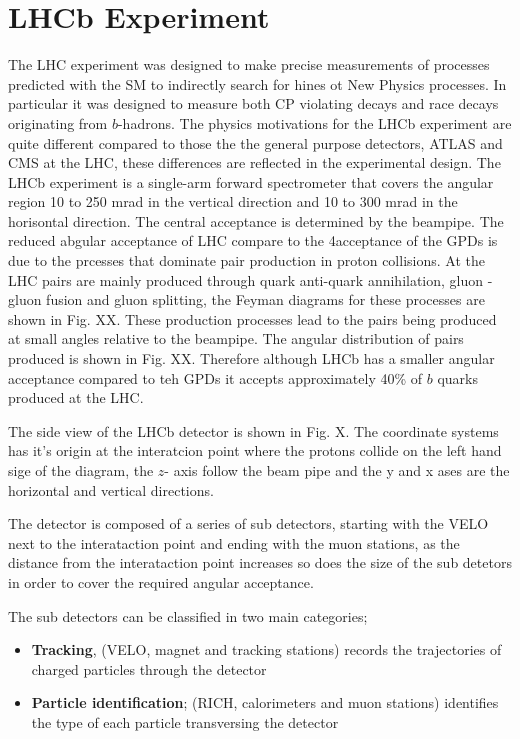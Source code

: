\section{LHCb Experiment}

The LHC experiment was designed to make precise measurements of processes predicted with the SM to indirectly search for hines ot New Physics processes. %
In particular it was designed to measure both CP violating decays and race decays originating from $b$-hadrons. The physics motivations for the LHCb experiment are quite different compared to those the the general purpose detectors, ATLAS and CMS at the LHC, these differences are reflected in the experimental design. The LHCb experiment is a single-arm forward spectrometer that covers the angular region 10 to 250 mrad in the vertical direction and 10 to 300 mrad in the horisontal direction. The central acceptance is determined by the beampipe. The reduced abgular acceptance of LHC compare to the 4\pi acceptance of the GPDs is due to the prcesses that dominate \bbbar pair production in proton collisions. At the LHC \bbbar pairs are mainly produced through quark anti-quark annihilation, gluon - gluon fusion and gluon splitting, the Feyman diagrams for these processes are shown in Fig. XX. %
These production processes lead to the \bbbar pairs being produced at small angles relative to the beampipe. The angular distribution of \bbbar pairs produced is shown in Fig. XX. Therefore although LHCb has a smaller angular acceptance compared to teh GPDs it accepts approximately 40\% of $b$ quarks produced at the LHC.

The side view of the LHCb detector is shown in Fig. X. The coordinate systems has it's origin at the interatcion point where the protons collide on the left hand sige of the diagram, the $z$- axis follow the beam pipe and the y and x ases are the horizontal and vertical directions. 

The detector is composed of a series of sub detectors, starting with the VELO next to the interataction point and ending with the muon stations, as the distance from the interataction point increases so does the size of the sub detetors in order to cover the required angular acceptance.

The sub detectors can be classified in two main categories;
\begin{itemize}
\item {\bf Tracking}, (VELO, magnet and tracking stations) records the trajectories of charged particles through the detector
\item {\bf Particle identification}; (RICH, calorimeters and muon stations) identifies the type of each particle transversing the detector
\end{itemize}

